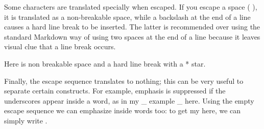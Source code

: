 \documentclass{book}
\begin{document}
\begin{mdP}[data-line={430}]%
{}Some characters are translated specially when escaped.
If you escape a space (%
{}%
{}), it is translated as a non-breakable space, while
a backslash at the end of a line causes a hard line break to be inserted. The 
latter is recommended over using the standard Markdown way of using two spaces
at the end of a line because it leaves visual clue that a line break occurs.%
\end{mdP}%
\begin{mdDiv}[class={sample},elem={sample},margin-bottom={2ex},data-line={436}]%
\begin{mdDiv}[class={sampleblock},elem={sampleblock},padding-left={1em},padding-right={1em},padding-top={-1ex},border-style={solid},border-width={1\cssPixel},line-adjust={0},data-line={437}]%
\begin{mdPre}[class={para-block,samplesource,noescape,pre-fenced},line-adjust={0},data-line={437},data-line-code={438}]%
%
\end{mdPre}%
\mdHr[class={madoko},width={0.50\linewidth},text-align={left},data-line={441}]{}\begin{mdP}[data-line={442}]%
{}Here is non%
{}{\mdNbsp}%
{}breakable space and a hard%
{}\mdBr
{}line break with a %
{}*%
{} star.%
\end{mdP}%
\end{mdDiv}%
\end{mdDiv}%
\begin{mdP}[data-line={441}]%
{}Finally, the escape sequence %
{}\mdCode[class={code,code1}]{{\textbackslash}/}%
{} translates to nothing; this can be very 
useful to separate certain constructs. For example, emphasis is suppressed
if the underscores appear inside a word, as in my%
{}\_%
{}example%
{}\_%
{}here. Using the
empty escape sequence we can emphasize inside words too: to get
my%
{}%
{}%
{}%
{}here, we can simply write %
{}%
{}.%
\end{mdP}%
\end{document}
